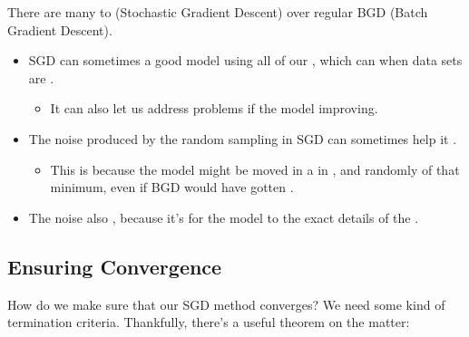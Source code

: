         \begin{concept}
            There are many  to  (Stochastic Gradient Descent) over regular BGD (Batch Gradient Descent).
            
            \begin{itemize}
                \item SGD can sometimes  a good model  using all of our , which can  when data sets are .
                    \begin{itemize}
                        \item It can also let us address problems  if the model  improving.
                    \end{itemize}
                    
                \item The noise produced by the random sampling in SGD can sometimes help it .
                    \begin{itemize}
                        \item This is because the model might be moved in a  in , and randomly  of that minimum, even if BGD would have gotten .
                    \end{itemize}
                    
                \item The noise also , because it's  for the model to  the exact details of the .
            \end{itemize}
        \end{concept}
        
    \subsection{Ensuring Convergence}
    
        How do we make sure that our SGD method converges? We need some kind of termination criteria. Thankfully, there's a useful theorem on the matter:\\
        
